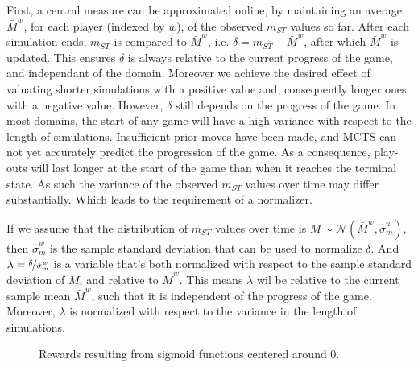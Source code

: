 \documentclass{ecai2010}
\begin{document}
First, a central measure can be approximated online, by maintaining an average $\bar{M}^w$, for each player (indexed by $w$), of the observed $m_{ST}$ values so far. After each simulation ends, $m_{ST}$ is compared to $\bar{M}^w$, i.e. $\delta = m_{ST} - \bar{M}^w$, after which $\bar{M}^w$ is updated. This ensures $\delta$ is always relative to the current progress of the game, and independant of the domain. Moreover we achieve the desired effect of valuating shorter simulations with a positive value and, consequently longer ones with a negative value. However, $\delta$ still depends on the progress of the game. In most domains, the start of any game will have a high variance with respect to the length of simulations. Insufficient prior moves have been made, and MCTS can not yet accurately predict the progression of the game. As a consequence, play-outs will last longer at the start of the game than when it reaches the terminal state. As such the variance of the observed $m_{ST}$ values over time may differ substantially. Which leads to the requirement of a normalizer.

If we assume that the distribution of $m_{ST}$ values over time is $M \sim \mathcal{N}(\bar{M}^w, \hat{\sigma}^w_m)$, then $\hat{\sigma}^w_m$ is the sample standard deviation that can be used to normalize $\delta$. And $\lambda = \nicefrac{\delta}{\hat{\sigma}^w_m}$ is a variable that's both normalized with respect to the sample standard deviation of $M$, and relative to $\bar{M}^w$. This means $\lambda$ wil be relative to the current sample mean $\bar{M}^w$, such that it is independent of the progress of the game. Moreover, $\lambda$ is normalized with respect to the variance in the length of simulations.



\begin{figure}[ht]
\centering
{}
    \caption{Rewards resulting from sigmoid functions centered around 0.}
	\label{fig:sigmoids}
\end{figure}
\end{document}
